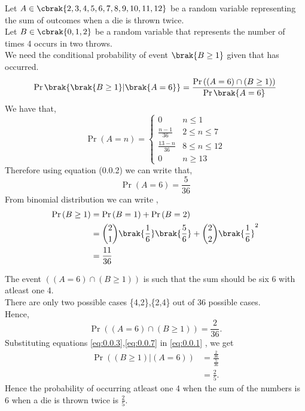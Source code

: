 Let $A \in \cbrak{2,3,4,5,6,7,8,9,10,11,12}$ be a random variable representing the sum of outcomes when a die is thrown twice.\\
Let $B \in \cbrak{0,1,2}$  be a random variable that represents the number of times 4 occurs in two throws.\\
We need the conditional probability of event $\brak{B \geq 1}$ given that  has occurred.\\ 
\begin{equation}
    \Pr{\brak{\brak{B \geq 1}|\brak{A=6}}}
    =\frac{\Pr{((A=6)\cap(B \geq 1))}}{\Pr{\brak{A=6}}}\label{eq:0.0.1}
\end{equation}
We have that,\\
\begin{equation}
\Pr{(A=n)}=
\begin{cases}
    0 & n \leq 1\\
    \frac{n-1}{36} & 2\leq n \leq 7\\
    \frac{13-n}{36} & 8 \leq n \leq 12\\
    0 & n \geq 13
\end{cases}
\end{equation}
Therefore using equation (0.0.2) we can write that,
\begin{equation}
    \Pr{(A=6)}=\frac{5}{36}\label{eq:0.0.3}
\end{equation}
From binomial distribution we can write ,
\begin{align}
    \Pr{(B \geq 1)}&=\Pr{(B =1)}+\Pr{(B=2)} \\ &= \binom{2}{1} \brak {\frac{1}{6}}\brak {\frac{5}{6}}+\binom{2}{2} \brak {\frac{1}{6}}^2\\
    &=\frac{11}{36}
\end{align}

The event $((A=6) \cap (B\geq 1))$ is such that the sum should be six 6 with atleast one 4.\\
There are only two possible cases \{4,2\},\{2,4\} out of 36 possible cases.\\
Hence,\\
\begin{equation}
    \Pr{((A=6) \cap (B\geq 1))}=\frac{2}{36}.\label{eq:0.0.7}
\end{equation}
Substituting equations \eqref{eq:0.0.3},\eqref{eq:0.0.7} in \eqref{eq:0.0.1} , we get\\
\begin{equation}
\begin{split}
\Pr((B \geq 1)|(A=6
))&=\frac{\frac{2}{36}}{\frac{5}{36}}\\
&=\frac{2}{5}.
\end{split}
\end{equation}
Hence the probability of occurring atleast one 4 when the sum of the numbers is 6 when a die is thrown twice is $\frac{2}{5}$. 
